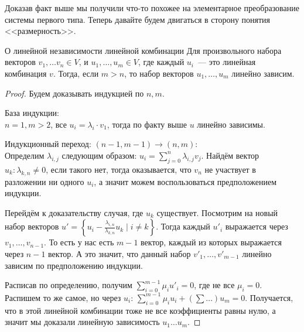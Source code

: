 \begin{motivation}
    Доказав факт выше мы получили что-то похожее на элементарное преобразование системы первого типа.
    Теперь давайте будем двигаться в сторону понятия <<размерность>>.
\end{motivation}
\begin{theorem}{О линейной независимости линейной комбинации}
Для произвольного набора векторов
$v_1,\dots v_n\in V$, и $u_1,\dots, u_m\in V$, где каждый $u_i$~--- это линейная комбинация $v$. 
Тогда, если $m > n$, то набор векторов $u_1,\dots,u_m$ линейно зависим.
\end{theorem}
\begin{proof}
    Будем доказывать индукцией по $n,m$.

    База индукции:\\$n = 1, m > 2$, все $u_i = \lambda_i\cdot v_1$, тогда по факту выше $u$ линейно зависимы.

    Индукционный переход: $(n-1,m-1)\rightarrow (n,m)$:\\
    Определим $\lambda_{i,j}$ следующим образом: $u_i = \sum_{j=0}^{n} \lambda_{i,j} v_j$.
    Найдём вектор $u_k\colon \lambda_{k,n}\not=0$, если такого нет, тогда оказывается, что $v_n$ не
    участвует в разложении ни одного $u_i$, а значит можем воспользоваться предположением индукции.

    Перейдём к доказательству случая, где $u_k$ существует.
    Посмотрим на новый набор векторов $u' = \left\{u_i - \frac{\lambda_{i,n}}{\lambda_{k,n}}u_k \mid i\not=k\right\}$.
    Тогда каждый $u'_i$ выражается через $v_1,\dots,v_{n-1}$.
    То есть у нас есть $m-1$ вектор, каждый из которых выражается
    через $n-1$ вектор. А это значит, что данный набор $v'_1,\dots, v'_{m-1}$ линейно зависим по предположению индукции.

    Расписав по определению, получим $\sum_{i=0}^{m-1}\mu_i u'_i = 0$, где не все $\mu_i=0$.
    Распишем то же самое, но через $u_i$: $\sum_{i=0}^{m-1}\mu_iu_i + (\sum\dots)u_m=0$. Получается, что в этой
    линейной комбинации тоже не все коэффициенты равны нулю, а значит мы доказали линейную зависимость $u_1\dots u_m$. 
\end{proof}

